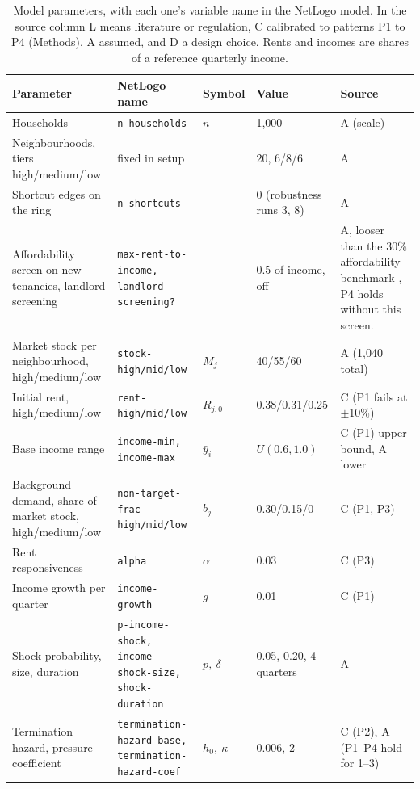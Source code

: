 \documentclass[10pt,a4paper]{article}
\begin{document}
\begin{table}[tp]
\centering
\caption{Model parameters, with each one's variable name in the NetLogo model. In the source column L means literature or regulation, C calibrated to patterns P1 to P4 (Methods), A assumed, and D a design choice. Rents and incomes are shares of a reference quarterly income.}
\label{tab:params}
\footnotesize
\begin{tabular}{L{3.5cm}L{3.5cm}L{1.6cm}L{2.3cm}L{3.0cm}}
\toprule
\textbf{Parameter} & \textbf{NetLogo name} & \textbf{Symbol} & \textbf{Value} & \textbf{Source} \\
\midrule
Households & \texttt{\scriptsize n-households} & $n$ & 1,000 & A (scale) \\
Neighbourhoods, tiers high/medium/low & \scriptsize fixed in setup & & 20, 6/8/6 & A \\
Shortcut edges on the ring & \texttt{\scriptsize n-shortcuts} & & 0 (robustness runs 3, 8) & A \\
Affordability screen on new tenancies, landlord screening & \texttt{\scriptsize max-rent-to-income,\allowbreak{} landlord-screening?} & & 0.5 of income, off & A, looser than the 30\% affordability benchmark \citep{25}, P4 holds without this screen. \\
Market stock per neighbourhood, high/medium/low & \texttt{\scriptsize stock-high/mid/low} & $M_j$ & 40/55/60 & A (1,040 total) \\
Initial rent, high/medium/low & \texttt{\scriptsize rent-high/mid/low} & $R_{j,0}$ & 0.38/0.31/0.25 & C (P1 fails at $\pm$10\%) \\
Base income range & \texttt{\scriptsize income-min,\allowbreak{} income-max} & $\bar y_i$ & $U(0.6,1.0)$ & C (P1) upper bound, A lower \\
Background demand, share of market stock, high/medium/low & \texttt{\scriptsize non-target-frac-\allowbreak high/mid/low} & $b_j$ & 0.30/0.15/0 & C (P1, P3) \\
Rent responsiveness & \texttt{\scriptsize alpha} & $\alpha$ & 0.03 & C (P3) \\
Income growth per quarter & \texttt{\scriptsize income-growth} & $g$ & 0.01 & C (P1) \\
Shock probability, size, duration & \texttt{\scriptsize p-income-shock,\allowbreak{} income-shock-size,\allowbreak{} shock-duration} & $p,\ \delta$ & 0.05, 0.20, 4 quarters & A \\
Termination hazard, pressure coefficient & \texttt{\scriptsize termination-hazard-base,\allowbreak{} termination-hazard-coef} & $h_0,\ \kappa$ & 0.006, 2 & C (P2), A (P1--P4 hold for 1--3) \\

\end{tabular}
\end{table}
\end{document}
